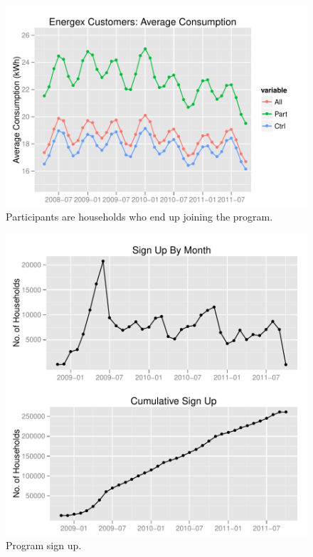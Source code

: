 \documentclass[a4paper,11pt]{article}
\begin{document}
\begin{figure}
\begin{center}
\includegraphics[width=1\textwidth]{figures/EnergexAvgConsump1.pdf}
\caption{Participants are households who end up joining the program.}
\end{center}
\end{figure}

\begin{figure}
\begin{center}
\includegraphics[width=1\textwidth]{figures/PartSignUp.pdf}
\caption{Program sign up.}
\end{center}
\end{figure}
\end{document}
